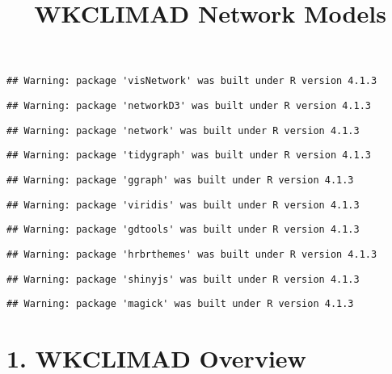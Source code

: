 \documentclass[
]{article}
\title{WKCLIMAD Network Models}
\author{}
\date{\vspace{-2.5em}}
\begin{document}
\maketitle

{
\setcounter{tocdepth}{2}
\tableofcontents
}
\begin{verbatim}
## Warning: package 'visNetwork' was built under R version 4.1.3
\end{verbatim}

\begin{verbatim}
## Warning: package 'networkD3' was built under R version 4.1.3
\end{verbatim}

\begin{verbatim}
## Warning: package 'network' was built under R version 4.1.3
\end{verbatim}

\begin{verbatim}
## Warning: package 'tidygraph' was built under R version 4.1.3
\end{verbatim}

\begin{verbatim}
## Warning: package 'ggraph' was built under R version 4.1.3
\end{verbatim}

\begin{verbatim}
## Warning: package 'viridis' was built under R version 4.1.3
\end{verbatim}

\begin{verbatim}
## Warning: package 'gdtools' was built under R version 4.1.3
\end{verbatim}

\begin{verbatim}
## Warning: package 'hrbrthemes' was built under R version 4.1.3
\end{verbatim}

\begin{verbatim}
## Warning: package 'shinyjs' was built under R version 4.1.3
\end{verbatim}

\begin{verbatim}
## Warning: package 'magick' was built under R version 4.1.3
\end{verbatim}

\hypertarget{wkclimad-overview}{%
\section{1. WKCLIMAD Overview}\label{wkclimad-overview}}
\end{document}
